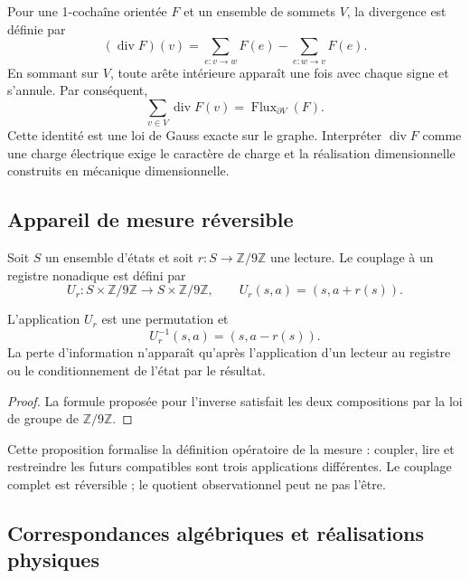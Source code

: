 Pour une 1-cochaîne orientée \(F\) et un ensemble de sommets \(V\), la
divergence est définie par
\[
 (\operatorname{div}F)(v)=
 \sum_{e:v\to w}F(e)-\sum_{e:w\to v}F(e).
\]
En sommant sur \(V\), toute arête intérieure apparaît une fois avec chaque signe et
s’annule. Par conséquent,
\[
 \boxed{
 \sum_{v\in V}\operatorname{div}F(v)
 =\operatorname{Flux}_{\partial V}(F).}
\]
Cette identité est une loi de Gauss exacte sur le graphe. Interpréter
\(\operatorname{div}F\) comme une charge électrique exige le caractère de charge et la
réalisation dimensionnelle construits en mécanique dimensionnelle.

\subsection{Appareil de mesure réversible}
\label{v:v:rec:completaciones:section:10}

Soit \(S\) un ensemble d’états et soit \(r:S\to\mathbb Z/9\mathbb Z\) une
lecture. Le couplage à un registre nonadique est défini par
\[
 U_r:S\times\mathbb Z/9\mathbb Z\longrightarrow
 S\times\mathbb Z/9\mathbb Z,
 \qquad
 U_r(s,a)=(s,a+r(s)).
\]

\begin{proposition}
\label{v:v:rec:completaciones:statement:05}
L’application \(U_r\) est une permutation et
\[
 U_r^{-1}(s,a)=(s,a-r(s)).
\]
La perte d’information n’apparaît qu’après l’application d’un lecteur au
registre ou le conditionnement de l’état par le résultat.
\end{proposition}

\begin{proof}
La formule proposée pour l’inverse satisfait les deux compositions par la
loi de groupe de \(\mathbb Z/9\mathbb Z\).
\end{proof}

Cette proposition formalise la définition opératoire de la mesure : coupler,
lire et restreindre les futurs compatibles sont trois applications différentes. Le
couplage complet est réversible ; le quotient observationnel peut ne pas l’être.

\subsection{Correspondances algébriques et réalisations physiques}
\label{v:v:rec:completaciones:section:11}

